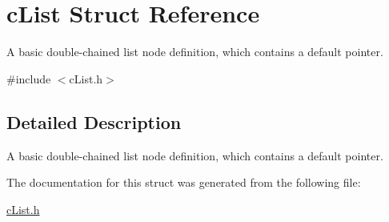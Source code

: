 \hypertarget{structcList}{}\section{c\+List Struct Reference}
\label{structcList}


A basic double-\/chained list node definition, which contains a default pointer.  




{\ttfamily \#include $<$c\+List.\+h$>$}



\subsection{Detailed Description}
A basic double-\/chained list node definition, which contains a default pointer. 

The documentation for this struct was generated from the following file\+:\begin{DoxyCompactItemize}
\item 
\mbox{\hyperlink{cList_8h}{c\+List.\+h}}\end{DoxyCompactItemize}
